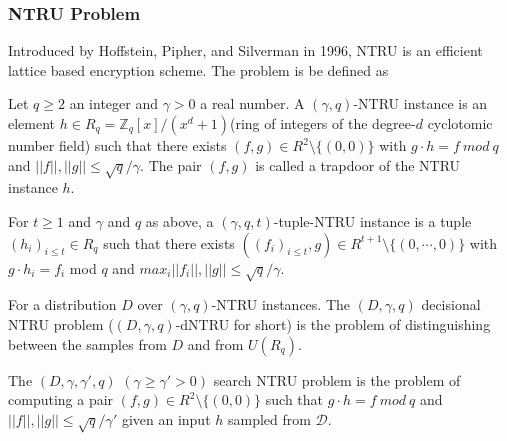 \subsubsection{NTRU Problem}
Introduced by Hoffstein, Pipher, and Silverman \cite{NTRUJHJPJHS,NTRUEncrypt,hoffstein2006ntru} in 1996, NTRU is an efficient lattice based encryption scheme. The problem is be defined as
\begin{definition}
    Let $q \geq 2$ an integer and $\gamma > 0$ a real number. A $(\gamma, q)$-NTRU instance is an element $h \in R_q=\mathbb{Z}_q[x]/(x^d+1)$(ring of integers of the degree-$d$ cyclotomic number field) such that there exists $(f,g) \in R^2 \setminus \{(0,0)\}$ with $g\cdot h = f \ mod\ q$ and $||f||,||g|| \leq \sqrt{q}/\gamma$. The pair
    $(f,g)$ is called a trapdoor of the NTRU instance $h$.

    For $t \geq 1$ and $\gamma$ and $q$ as above, a $(\gamma,q,t)$-tuple-NTRU instance is a tuple $(h_i)_{i\leq t} \in R_q$ such that there exists $((f_i)_{i\leq t},g) \in R^{t+1} \setminus \{(0,\cdots,0)\}$ with $g\cdot h_i=f_i$ mod $q$ and $max_i ||f_i||,||g|| \leq \sqrt{q}/\gamma$.



    For a  distribution $D$ over $(\gamma, q)$-NTRU instances. The $(D, \gamma, q)$ decisional NTRU problem ($(D, \gamma, q)$-dNTRU for short) is the problem of distinguishing  between the samples from $D$ and from $U(R_q)$.

    The $(D, \gamma, \gamma',q)$ $(\gamma \geq \gamma' > 0)$ search NTRU problem is the problem of computing a pair $(f,g) \in R^2 \setminus \{(0,0)\}$ such that $g \cdot h = f\ mod\ q$ and $||f||, ||g|| \leq \sqrt{q}/\gamma'$ given an input $h$ sampled from $\mathcal{D}$.

\end{definition}

